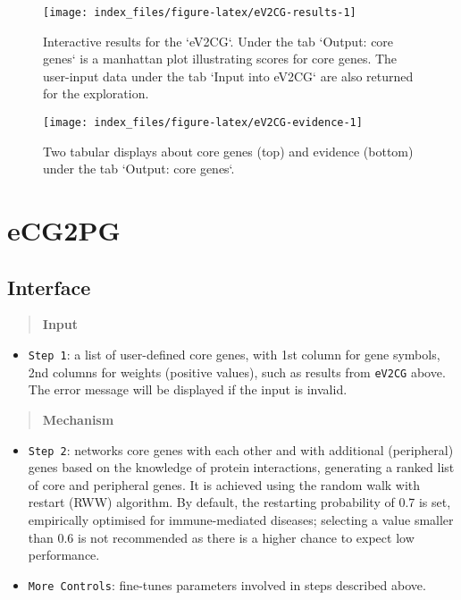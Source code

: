 \documentclass[
  oneside]{book}
\providecommand{\tightlist}{%
  \setlength{\itemsep}{0pt}\setlength{\parskip}{0pt}}
\begin{document}
\begin{figure}

{\centering \texttt{[image: index\_files/figure-latex/eV2CG-results-1]} 

}

\caption{Interactive results for the `eV2CG`. Under the tab `Output: core genes` is a manhattan plot illustrating scores for core genes. The user-input data under the tab `Input into eV2CG` are also returned for the exploration.}\label{fig:eV2CG-results}
\end{figure}

\begin{figure}

{\centering \texttt{[image: index\_files/figure-latex/eV2CG-evidence-1]} 

}

\caption{Two tabular displays about core genes (top) and evidence (bottom) under the tab `Output: core genes`.}\label{fig:eV2CG-evidence}
\end{figure}

\hypertarget{ecg2pg}{%
\chapter{eCG2PG}\label{ecg2pg}}

\hypertarget{interface-1}{%
\section{Interface}\label{interface-1}}

\begin{quote}
\textbf{Input}
\end{quote}

\begin{itemize}
\tightlist
\item
  \texttt{Step\ 1}: a list of user-defined core genes, with 1st column for gene symbols, 2nd columns for weights (positive values), such as results from \texttt{eV2CG} above. The error message will be displayed if the input is invalid.
\end{itemize}

\begin{quote}
\textbf{Mechanism}
\end{quote}

\begin{itemize}
\item
  \texttt{Step\ 2}: networks core genes with each other and with additional (peripheral) genes based on the knowledge of protein interactions, generating a ranked list of core and peripheral genes. It is achieved using the random walk with restart (RWW) algorithm. By default, the restarting probability of 0.7 is set, empirically optimised for immune-mediated diseases; selecting a value smaller than 0.6 is not recommended as there is a higher chance to expect low performance.
\item
  \texttt{More\ Controls}: fine-tunes parameters involved in steps described above.
\end{itemize}
\end{document}
